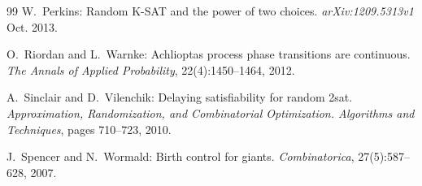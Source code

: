 \documentclass[11pt,reqno]{amsart}
\numberwithin{equation}{section}
\begin{document}
\begin{thebibliography}{99}
	 W.\ Perkins: Random K-SAT and the power of two choices. \emph{arXiv:1209.5313v1} Oct. 2013.
	
	 O.\ Riordan and L.\ Warnke: Achlioptas process phase transitions are continuous. \emph{The Annals of Applied Probability}, 22(4):1450–1464, 2012.
	
	 A.\ Sinclair and D.\ Vilenchik: Delaying satisfiability for random 2sat. \emph{Approximation,
		Randomization, and Combinatorial Optimization. Algorithms and Techniques}, pages 710--723, 2010.
	
	  J.\ Spencer and N.\ Wormald: Birth control for giants. \emph{Combinatorica}, 27(5):587–628, 2007.
\end{thebibliography}
	
\end{document}
